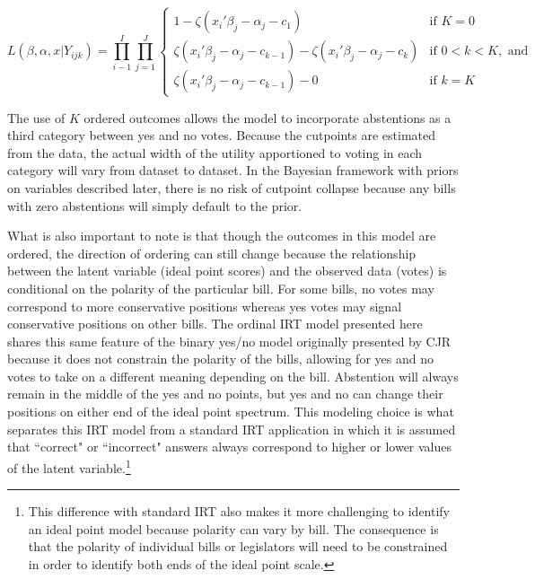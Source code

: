 					\[
	L(\beta,\alpha,x|Y_{ijk}) = \prod_{i-1}^{I} \prod_{j=1}^{J}
	\begin{cases} 
	1 -  \zeta(x_{i}'\beta_j - \alpha_j - c_1) & \text{if } K = 0 \\
	\zeta(x_{i}'\beta_j - \alpha_j - c_{k-1}) - \zeta(x_{i}'\beta_j - \alpha_j - c_{k})       & \text{if } 0 < k < K, \text{ and} \\
	\zeta(x_{i}'\beta_j - \alpha_j - c_{k-1}) - 0 & \text{if } k=K
	\end{cases}
	\]
	
	The use of $K$ ordered outcomes allows the model to incorporate abstentions as a third category between yes and no votes. Because the cutpoints are estimated from the data, the actual width of the utility apportioned to voting in each category will vary from dataset to dataset. In the Bayesian framework with priors on variables described later, there is no risk of cutpoint collapse because any bills with zero abstentions will simply default to the prior.
	
		What is also important to note is that though the outcomes in this model are ordered, the direction of ordering can still change because the relationship between the latent variable (ideal point scores) and the observed data (votes) is conditional on the polarity of the particular bill. For some bills, no votes may correspond to more conservative positions whereas yes votes may signal conservative positions on other bills. The ordinal IRT model presented here shares this same feature of the binary yes/no model originally presented by CJR because it does not constrain the polarity of the bills, allowing for yes and no votes to take on a different meaning depending on the bill. Abstention will always remain in the middle of the yes and no points, but yes and no can change their positions on either end of the ideal point spectrum. This modeling choice is what separates this IRT model from a standard IRT application in which it is assumed that ``correct" or ``incorrect" answers always correspond to higher or lower values of the latent variable.\footnote{This difference with standard IRT also makes it more challenging to identify an ideal point model because polarity can vary by bill. The consequence is that the polarity of individual bills or legislators will need to be constrained in order to identify both ends of the ideal point scale.}
	
